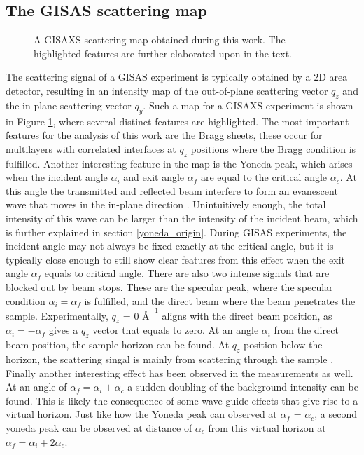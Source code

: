 \subsection{The GISAS scattering map}
\begin{figure}
	\centering
	\def\svgwidth{\textwidth}
	
	\caption{A GISAXS scattering map obtained during this work. The highlighted features are further elaborated upon in the text.}
	\label{gisaxs_features}
\end{figure}
The scattering signal of a GISAS experiment is typically obtained by a 2D area detector, resulting in an intensity map of the out-of-plane scattering vector $q_z$ and the in-plane scattering vector $q_y$. Such a map for a GISAXS experiment is shown in Figure \ref{gisaxs_features}, where several distinct features are highlighted. The most important features for the analysis of this work are the Bragg sheets, these occur for multilayers with correlated interfaces at $q_z$ positions where the Bragg condition is fulfilled. Another interesting feature in the map is the Yoneda peak, which arises when the incident angle $\alpha_i$ and exit angle $\alpha_f$ are equal to the critical angle $\alpha_c$. At this angle the transmitted and reflected beam interfere to form an evanescent wave that moves in the in-plane direction \cite{matthias_GISAXS}. Unintuitively enough, the total intensity of this wave can be larger than the intensity of the incident beam, which is further explained in section \ref{yoneda_origin}. During GISAS experiments, the incident angle may not always be fixed exactly at the critical angle, but it is typically close enough to still show clear features from this effect when the exit angle $\alpha_f$ equals to critical angle. There are also two intense signals that are blocked out by beam stops. These are the specular peak, where the specular condition $\alpha_i= \alpha_f$ is fulfilled, and the direct beam where the beam penetrates the sample. Experimentally, $q_z$ = 0 $Å^{-1}$ aligns with the direct beam position, as $\alpha_i = -\alpha_f$ gives a $q_z$ vector that equals to zero. At an angle $\alpha_i$ from the direct beam position, the sample horizon can be found. At $q_z$ position below the horizon, the scattering singal is mainly from scattering through the sample \cite{GISAXS_santoro}. Finally another interesting effect has been observed in the measurements as well. At an angle of $\alpha_f = \alpha_i + \alpha_c$ a sudden doubling of the background intensity can be found. This is likely the consequence of some wave-guide effects that give rise to a virtual horizon. Just like how the Yoneda peak can observed at $\alpha_f$ = $\alpha_c$, a second yoneda peak can be observed at distance of $\alpha_c$ from this virtual horizon at $\alpha_f = \alpha_i + 2\alpha_c$.

